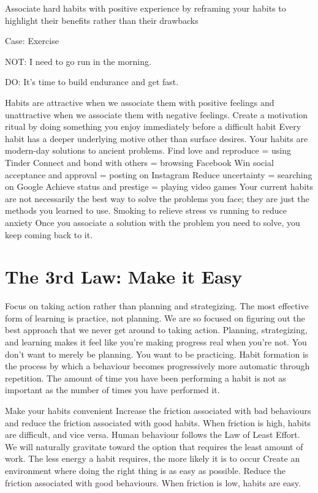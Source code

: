 \documentclass[10pt,twocolumn]{../notes}
\begin{document}
\Advice Associate hard habits with positive experience by reframing your habits to highlight their benefits rather than their drawbacks

\begin{Examplelist}{Case: Exercise}
  \item NOT: I need to go run in the morning.
  \item DO: It’s time to build endurance and get fast.
\end{Examplelist}

\Quote Habits are attractive when we associate them with positive feelings and unattractive when we associate them with negative feelings. Create a motivation ritual by doing something you enjoy immediately before a difficult habit
\Fact Every habit has a deeper underlying motive other than surface desires.
\Fact Your habits are modern-day solutions to ancient problems.
\Example Find love and reproduce = using Tinder
\Example Connect and bond with others = browsing Facebook
\Example Win social acceptance and approval = posting on Instagram
\Example Reduce uncertainty = searching on Google
\Example Achieve status and prestige = playing video games
\Fact Your current habits are not necessarily the best way to solve the problems you face; they are just the methods you learned to use.
\Example Smoking to relieve stress vs running to reduce anxiety
\Quote Once you associate a solution with the problem you need to solve, you keep coming back to it.

\section{The 3rd Law: Make it Easy}
\Advice Focus on taking action rather than planning and strategizing.
\Quote The most effective form of learning is practice, not planning.
\Quote We are so focused on figuring out the best approach that we never get around to taking action.
\Fact Planning, strategizing, and learning makes it feel like you’re making progress real when you’re not.
\Quote You don’t want to merely be planning. You want to be practicing.
\Quote Habit formation is the process by which a behaviour becomes progressively more automatic through repetition.
\Quote The amount of time you have been performing a habit is not as important as the number of times you have performed it.

\Advice Make your habits convenient
\How Increase the friction associated with bad behaviours and reduce the friction associated with good habits. When friction is high, habits are difficult, and vice versa.
\Quote Human behaviour follows the Law of Least Effort. We will naturally gravitate toward the option that requires the least amount of work.
\Fact The less energy a habit requires, the more likely it is to occur
\Quote Create an environment where doing the right thing is as easy as possible.
\Quote Reduce the friction associated with good behaviours. When friction is low, habits are easy.
\end{document}
